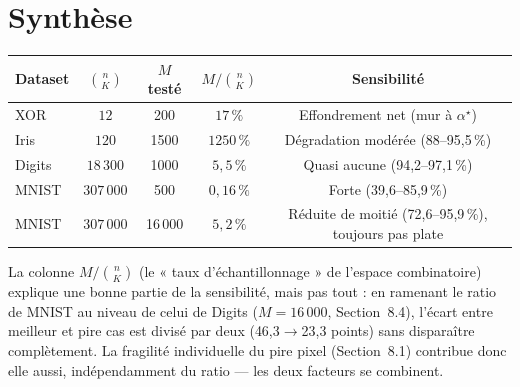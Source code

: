 \documentclass[12pt,a4paper]{article}
\theoremstyle{remark}
\begin{document}
\section{Synthèse}

\begin{center}
\renewcommand{\arraystretch}{1.3}
\begin{tabular}{lcccc}
\toprule
Dataset & $\binom{n}{K}$ & $M$ testé & $M/\binom{n}{K}$ & Sensibilité \\
\midrule
XOR    & $12$      & 200   & $17\,\%$    & Effondrement net (mur à $\alpha^\star$) \\
Iris   & $120$     & 1500  & $1250\,\%$  & Dégradation modérée (88--95,5\,\%) \\
Digits & $18\,300$ & 1000  & $5{,}5\,\%$ & Quasi aucune (94,2--97,1\,\%) \\
MNIST  & $307\,000$& 500   & $0{,}16\,\%$& Forte (39,6--85,9\,\%) \\
MNIST  & $307\,000$& 16\,000 & $5{,}2\,\%$ & Réduite de moitié (72,6--95,9\,\%), toujours pas plate \\
\bottomrule
\end{tabular}
\end{center}

La colonne $M/\binom{n}{K}$ (le « taux d'échantillonnage » de l'espace
combinatoire) explique une bonne partie de la sensibilité, mais pas tout :
en ramenant le ratio de MNIST au niveau de celui de Digits ($M=16\,000$,
Section~8.4), l'écart entre meilleur et pire cas est divisé par deux
(46,3$\to$23,3 points) sans disparaître complètement. La fragilité
individuelle du pire pixel (Section~8.1) contribue donc elle aussi,
indépendamment du ratio --- les deux facteurs se combinent.
\end{document}
